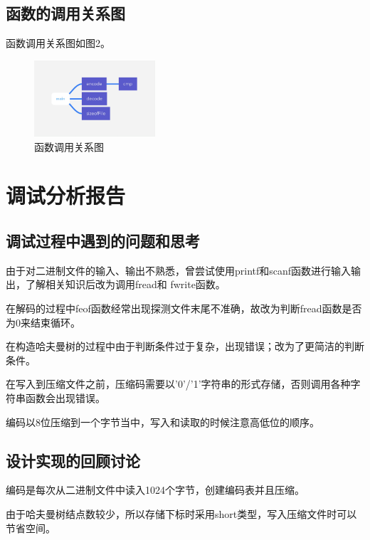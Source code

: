 \documentclass{article}
\begin{document}
\subsection{函数的调用关系图}

函数调用关系图如图2。

\begin{figure}[htbp]

    \centering\includegraphics[width=0.4\textwidth]{./Images/pic4_2_2.png}

    \caption{函数调用关系图}

\end{figure}

\section{调试分析报告}

\subsection{调试过程中遇到的问题和思考}

由于对二进制文件的输入、输出不熟悉，曾尝试使用printf和scanf函数进行输入输出，了解相关知识后改为调用fread和
fwrite函数。

在解码的过程中feof函数经常出现探测文件末尾不准确，故改为判断fread函数是否为0来结束循环。

在构造哈夫曼树的过程中由于判断条件过于复杂，出现错误；改为了更简洁的判断条件。

在写入到压缩文件之前，压缩码需要以'0'/'1'字符串的形式存储，否则调用各种字符串函数会出现错误。

编码以8位压缩到一个字节当中，写入和读取的时候注意高低位的顺序。

\subsection{设计实现的回顾讨论}

编码是每次从二进制文件中读入1024个字节，创建编码表并且压缩。

由于哈夫曼树结点数较少，所以存储下标时采用short类型，写入压缩文件时可以节省空间。
\end{document}
